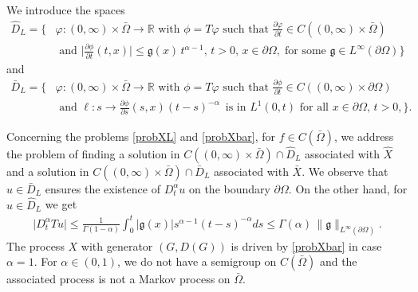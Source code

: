\documentclass[11pt,a4paper]{article}
\begin{document}
We introduce the spaces 
\begin{align*}
\hat{D}_L = \bigg\{ & \varphi: (0, \infty) \times \bar{\Omega} \to \mathbb{R} \textrm{ with $\phi= T\varphi$ such that } \frac{\partial \varphi}{\partial t}  \in C((0, \infty) \times \bar{\Omega})     \\ 
 &  \textrm{ and } \Big| \frac{\partial \phi}{\partial t}(t,x) \Big| \leq \mathfrak{g}(x)\, t^{\alpha-1},\, t >0,\, x \in \partial \Omega,\; \textrm{for some } \mathfrak{g} \in L^\infty(\partial \Omega) \bigg\}
\end{align*}
and 
\begin{align*}
\bar{D}_L = \bigg\{ & \varphi: (0, \infty) \times \bar{\Omega} \to \mathbb{R} \textrm{ with } \phi= T\varphi \textrm{ such that } \frac{\partial \phi}{\partial t} \in C((0, \infty) \times \partial \Omega)\\ 
 & \textrm{ and } \ell: s \to \frac{\partial \phi}{\partial s}(s, x) (t-s)^{-\alpha}\, \textrm{ is in } L^1(0, t) \textrm{ for all } x \in \partial \Omega,\, t>0, \bigg\}.
\end{align*}

Concerning the problems \eqref{probXL} and \eqref{probXbar}, for $f \in C(\bar{\Omega})$, we address the problem of finding a solution in $C((0, \infty) \times \bar{\Omega}) \cap \hat{D}_L$ associated with $\hat{X}$ and a solution in $C((0, \infty)\times \bar{\Omega}) \cap \bar{D}_L$ associated with $\bar{X}$. We observe that $u \in \bar{D}_L$ ensures the existence of $D^\alpha_t u$ on the boundary $\partial \Omega$. On the other hand, for $u \in \hat{D}_L$ we get 
\begin{align*}
\big| D^\alpha_t Tu \big| \leq  \frac{1}{\Gamma(1-\alpha)} \int_0^t |\mathfrak{g} (x)| s^{\alpha - 1} (t-s)^{-\alpha} ds \leq \Gamma(\alpha)\, \| \mathfrak{g}\|_{L^\infty (\partial \Omega)} .
\end{align*} 
The process $X$ with generator $(G, D(G))$ is driven by \eqref{probXbar} in case $\alpha=1$. For $\alpha \in (0,1)$, we do not have a semigroup on $C(\bar{\Omega})$ and the associated process is not a Markov process on $\bar{\Omega}$. 
\end{document}
